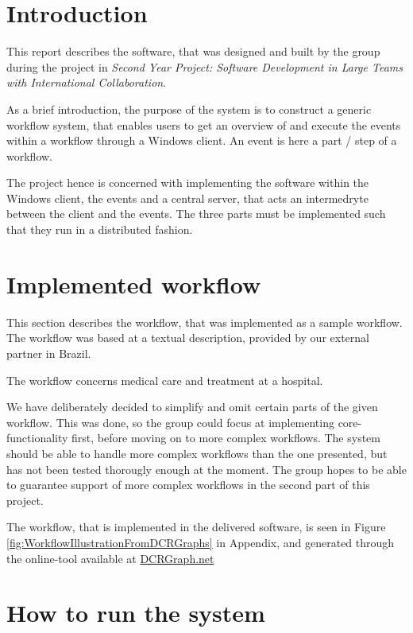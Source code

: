 \chapter{Introduction}\label{introduction}

This report describes the software, that was designed and built by the
group during the project in \emph{Second Year Project: Software
Development in Large Teams with International Collaboration}.

As a brief introduction, the purpose of the system is to construct a
generic workflow system, that enables users to get an overview of and
execute the events within a workflow through a Windows client. An event
is here a part / step of a workflow.

The project hence is concerned with implementing the software within the
Windows client, the events and a central server, that acts an
intermedryte between the client and the events. The three parts must be
implemented such that they run in a distributed fashion.

\chapter{Implemented workflow}\label{implemented-workflow}

This section describes the workflow, that was implemented as a sample workflow. The workflow was based at a textual description, provided by our external partner in Brazil.

The workflow concerns medical care and treatment at a hospital.

We have deliberately decided to simplify and omit certain parts of the
given workflow. This was done, so the group could focus at implementing
core-functionality first, before moving on to more complex workflows.
The system should be able to handle more complex workflows than the one
presented, but has not been tested thorougly enough at the moment. The
group hopes to be able to guarantee support of more complex workflows in
the second part of this project.

The workflow, that is implemented in the delivered software, is seen in Figure \ref{fig:WorkflowIllustrationFromDCRGraphs} in 
Appendix, and generated through the online-tool available
at \href{www.dcrgraph.net}{DCRGraph.net}

\chapter{How to run the system}\label{how-to-run-the-system}

